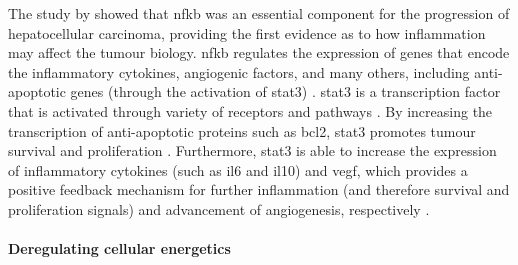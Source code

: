 The study by \citep{Pikarsky2004} showed that \gls{nfkb} was an essential component for the progression of hepatocellular carcinoma, providing the first evidence as to how inflammation may affect the tumour biology.
\gls{nfkb} regulates the expression of genes that encode the inflammatory cytokines, angiogenic factors, and many others, including anti-apoptotic genes (through the activation of \gls{stat3}) \citep{Elinav2013,Mantovani2008}.
\gls{stat3} is a transcription factor that is activated through variety of receptors and pathways \citep{Yu2007,Yu2014}.
By increasing the transcription of anti-apoptotic proteins such as \gls{bcl2}, \gls{stat3} promotes tumour survival and proliferation \citep{Yu2007}.
Furthermore, \gls{stat3} is able to increase the expression of inflammatory cytokines (such as \gls{il6} and \acrshort{il10}) and \acrshort{vegf}, which provides a positive feedback mechanism for further inflammation (and therefore survival and proliferation signals) and advancement of angiogenesis, respectively \citep{Yu2007}.


\paragraph{Deregulating cellular energetics}


